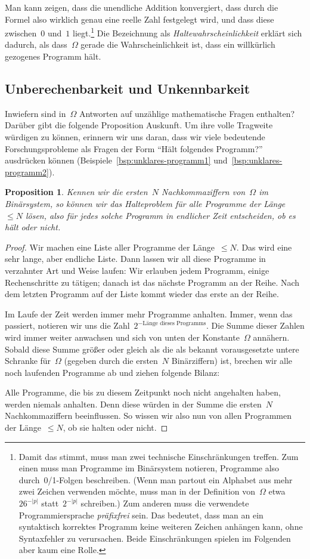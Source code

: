 \documentclass[twoside]{../zirkelblatt1415}
\theoremstyle{definition}
\theoremstyle{plain}
\newtheorem{prop}[defn]{Proposition}
\theoremstyle{remark}
\begin{document}
Man kann zeigen, dass die unendliche Addition konvergiert, dass durch die
Formel also wirklich genau eine reelle Zahl festgelegt wird, und dass diese
zwischen~$0$ und~$1$ liegt.\footnote{Damit das stimmt, muss man zwei technische
Einschränkungen treffen. Zum einen muss man Programme im Binärsystem notieren,
Programme also durch~0/1-Folgen beschreiben. (Wenn man partout ein Alphabet
aus mehr zwei Zeichen verwenden möchte, muss man in der Definition von~$\Omega$
etwa~$26^{-|p|}$ statt~$2^{-|p|}$ schreiben.) Zum anderen muss die
verwendete Programmiersprache \emph{präfixfrei} sein. Das bedeutet, dass man an
ein syntaktisch korrektes Programm keine weiteren Zeichen anhängen kann, ohne
Syntaxfehler zu verursachen. Beide Einschränkungen spielen im Folgenden aber
kaum eine Rolle.} Die Bezeichnung als \emph{Haltewahrscheinlichkeit} erklärt
sich dadurch, als dass~$\Omega$ gerade die Wahrscheinlichkeit ist, dass ein
willkürlich gezogenes Programm hält.


\subsection{Unberechenbarkeit und Unkennbarkeit}

Inwiefern sind in~$\Omega$ Antworten auf unzählige mathematische Fragen
enthalten? Darüber gibt die folgende Proposition Auskunft. Um ihre volle
Tragweite würdigen zu können, erinnern wir uns daran, dass wir viele
bedeutende Forschungsprobleme als Fragen der Form "`Hält folgendes Programm?"'
ausdrücken können (Beispiele~\ref{bsp:unklares-programm1}
und~\ref{bsp:unklares-programm2}).

\begin{prop}Kennen wir die ersten~$N$ Nachkommaziffern von~$\Omega$ im
Binärsystem, so können wir das Halteproblem für alle Programme der Länge~$\leq
N$ lösen, also für jedes solche Programm in endlicher Zeit entscheiden, ob es
hält oder nicht.\end{prop}
\begin{proof}Wir machen eine Liste aller Programme der Länge~$\leq N$. Das wird
eine sehr lange, aber endliche Liste. Dann lassen wir all diese Programme
in verzahnter Art und Weise laufen: Wir erlauben jedem Programm, einige
Rechenschritte zu tätigen; danach ist das nächste Programm an der Reihe. Nach
dem letzten Programm auf der Liste kommt wieder das erste an der Reihe.

Im Laufe der Zeit werden immer mehr Programme anhalten. Immer, wenn das
passiert, notieren wir uns die Zahl~$2^{-\text{Länge dieses
Programms}}$. Die Summe dieser Zahlen wird immer weiter anwachsen und sich von
unten der Konstante~$\Omega$ annähern. Sobald diese Summe größer oder gleich
als die als bekannt vorausgesetzte untere Schranke für~$\Omega$ (gegeben durch
die ersten~$N$ Binärziffern) ist, brechen wir alle noch laufenden Programme ab
und ziehen folgende Bilanz:

Alle Programme, die bis zu diesem Zeitpunkt noch nicht angehalten haben, werden
niemals anhalten. Denn diese würden in der Summe die ersten~$N$
Nachkommaziffern beeinflussen. So wissen wir also nun von allen Programmen der
Länge~$\leq N$, ob sie halten oder nicht.
\end{proof}
\end{document}
